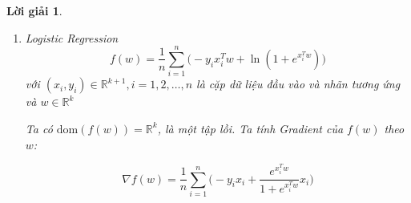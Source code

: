 \documentclass[14pt, a4paper]{article}
\theoremstyle{sltheorem}
\theoremstyle{soltheorem}
\newtheorem*{loigiai}{Lời giải}
\begin{document}
\begin{loigiai}
\begin{enumerate} [wide, labelwidth=!, labelindent=0pt,label=\textbf{\arabic*}.]
            Ta tính ma trận Hessian của $\lVert Ax - b \rVert_2^2$ theo $x$:
            \begin{equation*}
                \nabla^2 \lVert Ax - b \rVert_2^2=2A^TA
            \end{equation*}

            Ta xét:

            \begin{equation*}
                2p^TA^TAp=2(Ap)^TAp\geq0 \thickspace \forall p \in \mathbb{R}^{n} \Rightarrow 2A^TA \succeq 0
            \end{equation*}

            Mặt khác, $\mathrm{dom}(\lVert Ax - b \rVert_2^2)=\mathbb{R}^n$ là tập lồi. Vậy nên $\lVert Ax - b \rVert_2^2$ là hàm lồi

            Ta chứng minh $\lVert x \rVert_1$ là hàm lồi, với $\theta \in \lbrack 0, 1\rbrack, x,y \in \mathbb{R}^n$:

            \begin{equation*}
                \begin{aligned}
                    \lVert \theta x + (1-\theta)y \rVert_1 \leq \theta \lVert x \rVert_1 + (1-\theta)\lVert y \rVert_1 \thickspace \forall \thickspace \theta \in \lbrack 0, 1 \rbrack, x, y \in \mathbb{R}^n
                \end{aligned}
            \end{equation*}

            theo bất đẳng thức tam giác và $\mathrm{dom}(\lVert x \rVert_1)=\mathbb{R}^n$ là tập lồi nên $\lVert x \rVert_1$ là hàm lồi. 
            $\mathrm{dom}(f)$ là một tập lồi và tổng của hai hàm lồi là một hàm lồi nên $f(x)$ là một hàm lồi.

            \item Logistic Regression
            \begin{equation*}
                f(w)=\dfrac{1}{n}\sum_{i=1}^n \Big( -y_i x_i^T w + \ln(1 + e^{x_i^T w}) \Big)
            \end{equation*}
            với $(x_i, y_i) \in \mathbb{R}^{k+1},i=1,2,\dots,n$ là cặp dữ liệu đầu vào và nhãn tương ứng và $w \in \mathbb{R}^k$

            Ta có $\mathrm{dom}(f(w))=\mathbb{R}^{k}$, là một tập lồi. Ta tính Gradient của $f(w)$ theo $w$:

            \begin{equation*}
                \nabla f(w)=\dfrac{1}{n}\sum_{i=1}^n \Big( -y_i x_i + \dfrac{e^{x_i^Tw}}{1 + e^{x_i^T w}}x_i \Big)
            \end{equation*}


\end{enumerate}
\end{loigiai}
\end{document}
